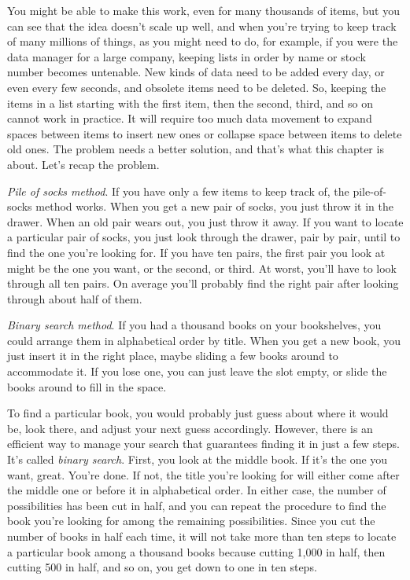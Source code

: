 You might be able to make this work, even for many thousands of items,
but you can see that the idea doesn't scale up well, and when you're
trying to keep track of many millions of things, as you might need to
do, for example, if you were the data manager for a large company,
keeping lists in order by name or stock number becomes
untenable. New kinds of data need to be added every day, or even every
few seconds, and obsolete items need to be deleted.
So, keeping the items in a list starting with the first item,
then the second, third, and so on cannot work in practice.
It will require too much data movement to expand spaces between
items to insert new ones or collapse space between items to delete old ones.
The problem needs a better solution,
and that's what this chapter is about.
Let's recap the problem.

\emph{Pile of socks method}.
If you have only a few items to keep track of,
the pile-of-socks method works.
When you get a new pair of socks, you just throw it in the drawer.
When an old pair wears out, you just throw it away.
If you want to locate a particular pair of socks,
you just look through the drawer,
pair by pair, until to find the one you're looking for.
If you have ten pairs, the first pair you look at might be
the one you want, or the second, or third.
At worst, you'll have to look through all ten pairs.
On average you'll probably find the right pair
after looking through about half of them.

\emph{Binary search method}.\label{binary-search-method}
If you had a thousand books on your bookshelves,
you could arrange them in alphabetical order by title.
When you get a new book, you just insert it in the right place,
maybe sliding a few books around to accommodate it.
If you lose one, you can just leave the slot empty,
or slide the books around to fill in the space.

To find a particular book, you would probably just guess about
where it would be, look there, and adjust your next guess accordingly.
However, there is an efficient way to manage your search that
guarantees finding it in just a few steps. It's called \emph{binary search}.
First, you look at the middle book.
If it's the one you want, great. You're done.
If not, the title you're looking for will either
come after the middle one or before it in alphabetical order.
In either case, the number of possibilities has been cut in half,
and you can repeat the procedure to find the book you're looking for
among the remaining possibilities.
Since you cut the number of books in half each time,
it will not take more than ten steps to locate
a particular book among a thousand books
because cutting 1,000 in half, then cutting 500 in half,
and so on, you get down to one in ten steps.

